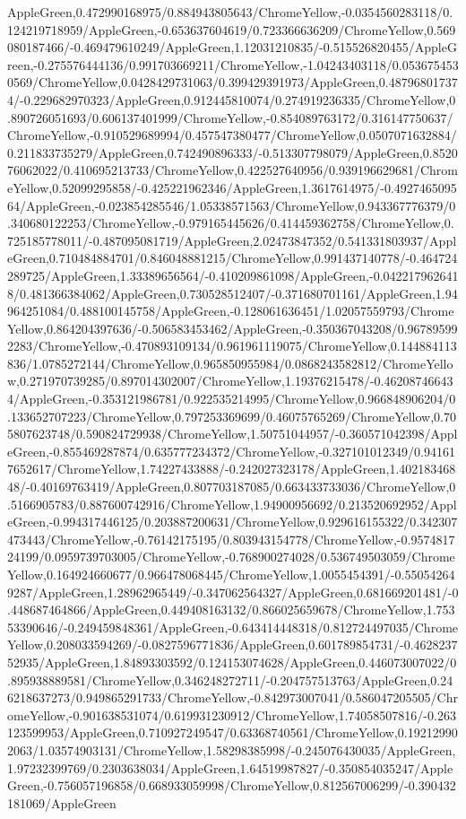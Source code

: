 {\begin{tikzternal}
AppleGreen,0.472990168975/0.884943805643/ChromeYellow,-0.0354560283118/0.124219718959/AppleGreen,-0.653637604619/0.723366636209/ChromeYellow,0.569080187466/-0.469479610249/AppleGreen,1.12031210835/-0.515526820455/AppleGreen,-0.275576444136/0.991703669211/ChromeYellow,-1.04243403118/0.0536754530569/ChromeYellow,0.0428429731063/0.399429391973/AppleGreen,0.487968017374/-0.229682970323/AppleGreen,0.912445810074/0.274919236335/ChromeYellow,0.890726051693/0.606137401999/ChromeYellow,-0.854089763172/0.316147750637/ChromeYellow,-0.910529689994/0.457547380477/ChromeYellow,0.0507071632884/0.211833735279/AppleGreen,0.742490896333/-0.513307798079/AppleGreen,0.852076062022/0.410695213733/ChromeYellow,0.422527640956/0.939196629681/ChromeYellow,0.52099295858/-0.425221962346/AppleGreen,1.3617614975/-0.492746509564/AppleGreen,-0.023854285546/1.05338571563/ChromeYellow,0.943367776379/0.340680122253/ChromeYellow,-0.979165445626/0.414459362758/ChromeYellow,0.725185778011/-0.487095081719/AppleGreen,2.02473847352/0.541331803937/AppleGreen,0.710484884701/0.846048881215/ChromeYellow,0.991437140778/-0.464724289725/AppleGreen,1.33389656564/-0.410209861098/AppleGreen,-0.0422179626418/0.481366384062/AppleGreen,0.730528512407/-0.371680701161/AppleGreen,1.94964251084/0.488100145758/AppleGreen,-0.128061636451/1.02057559793/ChromeYellow,0.864204397636/-0.506583453462/AppleGreen,-0.350367043208/0.967895992283/ChromeYellow,-0.470893109134/0.961961119075/ChromeYellow,0.144884113836/1.0785272144/ChromeYellow,0.965850955984/0.0868243582812/ChromeYellow,0.271970739285/0.897014302007/ChromeYellow,1.19376215478/-0.462087466434/AppleGreen,-0.353121986781/0.922535214995/ChromeYellow,0.966848906204/0.133652707223/ChromeYellow,0.797253369699/0.46075765269/ChromeYellow,0.705807623748/0.590824729938/ChromeYellow,1.50751044957/-0.360571042398/AppleGreen,-0.855469287874/0.635777234372/ChromeYellow,-0.327101012349/0.941617652617/ChromeYellow,1.74227433888/-0.242027323178/AppleGreen,1.40218346848/-0.40169763419/AppleGreen,0.807703187085/0.663433733036/ChromeYellow,0.5166905783/0.887600742916/ChromeYellow,1.94900956692/0.213520692952/AppleGreen,-0.994317446125/0.203887200631/ChromeYellow,0.929616155322/0.342307473443/ChromeYellow,-0.76142175195/0.803943154778/ChromeYellow,-0.957481724199/0.0959739703005/ChromeYellow,-0.768900274028/0.536749503059/ChromeYellow,0.164924660677/0.966478068445/ChromeYellow,1.0055454391/-0.550542649287/AppleGreen,1.28962965449/-0.347062564327/AppleGreen,0.681669201481/-0.448687464866/AppleGreen,0.449408163132/0.866025659678/ChromeYellow,1.75353390646/-0.249459848361/AppleGreen,-0.643414448318/0.812724497035/ChromeYellow,0.208033594269/-0.0827596771836/AppleGreen,0.601789854731/-0.462823752935/AppleGreen,1.84893303592/0.124153074628/AppleGreen,0.446073007022/0.895938889581/ChromeYellow,0.346248272711/-0.204757513763/AppleGreen,0.246218637273/0.949865291733/ChromeYellow,-0.842973007041/0.586047205505/ChromeYellow,-0.901638531074/0.619931230912/ChromeYellow,1.74058507816/-0.263123599953/AppleGreen,0.710927249547/0.63368740561/ChromeYellow,0.192129902063/1.03574903131/ChromeYellow,1.58298385998/-0.245076430035/AppleGreen,1.97232399769/0.2303638034/AppleGreen,1.64519987827/-0.350854035247/AppleGreen,-0.756057196858/0.668933059998/ChromeYellow,0.812567006299/-0.390432181069/AppleGreen
\end{tikzternal}}
